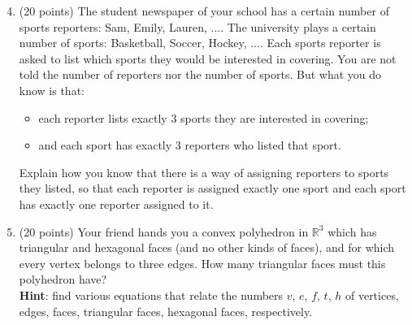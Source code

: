 \documentclass[11pt]{article}
\begin{document}
\pagebreak

\begin{enumerate}
\setcounter{enumi}{3}

\item (20 points) The student newspaper of your school has a certain number of sports reporters: Sam, Emily, Lauren, .... The university plays a certain number of sports: Basketball, Soccer, Hockey, .... Each sports reporter is asked to list which sports they would be interested in covering. You are not told the number of reporters nor the number of sports. But what you do know is that:
\begin{itemize}
\item each reporter lists exactly 3 sports they are interested in covering;
\item and each sport has exactly 3 reporters who listed that sport.
\end{itemize}
Explain how you know that there is a way of assigning reporters to sports they listed, so that each reporter is assigned exactly one sport and each sport has exactly one reporter assigned to it.

\item (20 points) Your friend hands you a convex polyhedron in $\mathbb{R}^3$ which has triangular and hexagonal faces (and no other kinds of faces), and for which every vertex belongs to three edges. How many triangular faces must this polyhedron have? \\
{\bf Hint}: find various equations that relate the numbers $v$, $e$, $f$, $t$, $h$ of vertices, edges, faces, triangular faces, hexagonal faces, respectively.
\end{enumerate}
\end{document}

